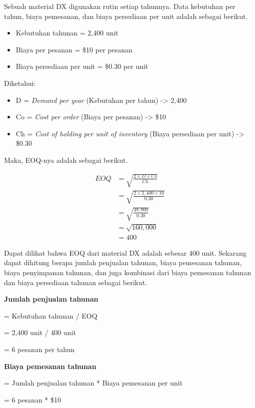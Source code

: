 Sebuah material DX digunakan rutin setiap tahunnya. Data kebutuhan per tahun, biaya pemesanan, dan biaya persediaan per unit adalah sebagai berikut.

\begin{itemize}
	\item Kebutuhan tahunan = 2,400 unit
	\item Biaya per pesanan = \${10} per pesanan
	\item Biaya persediaan per unit = \${0.30} per unit
\end{itemize}

Diketahui:
\begin{itemize}
	\item D = \textit{Demand per year} (Kebutuhan per tahun) -> 2,400
	\item Co = \textit{Cost per order} (Biaya per pesanan) -> \${10}
	\item Ch = \textit{Cost of holding per unit of inventory} (Biaya persediaan per unit) -> \${0.30}
\end{itemize}

Maka, EOQ-nya adalah sebagai berikut.

\begin{equation}
    \begin{split}
		EOQ
		&= \sqrt{\frac{2 \times D \times Co}{Ch}} \\
		&= \sqrt{\frac{2 \times 2,400 \times 10}{0.30}} \\
		&= \sqrt{\frac{48,000}{0.30}} \\
		&= \sqrt{160,000} \\
		&= 400
    \end{split}
\end{equation}

Dapat dilihat bahwa EOQ dari material DX adalah sebesar 400 unit. Sekarang dapat dihitung berapa jumlah penjualan tahunan, biaya pemesanan tahunan, biaya penyimpanan tahunan, dan juga kombinasi dari biaya pemesanan tahunan dan biaya persediaan tahunan sebagai berikut.

\textbf{Jumlah penjualan tahunan}

= Kebutuhan tahunan / EOQ

= 2,400 unit / 400 unit

= 6 pesanan per tahun

\textbf{Biaya pemesanan tahunan}

= Jumlah penjualan tahunan * Biaya pemesanan per unit

= 6 pesanan * \${10}

